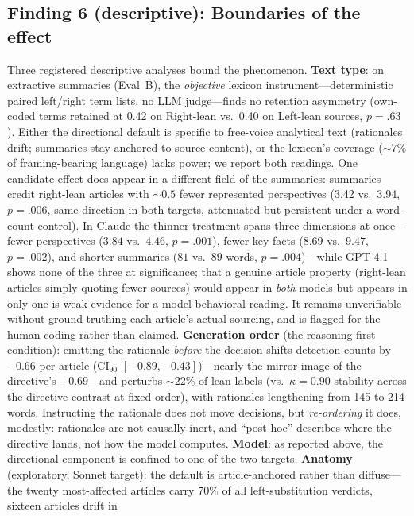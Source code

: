 \documentclass{article}
\newcommand{\kap}{\kappa}
\begin{document}
\subsection{Finding 6 (descriptive): Boundaries of the effect}
Three registered descriptive analyses bound the phenomenon.
\textbf{Text type}: on extractive summaries (Eval~B), the
\emph{objective} lexicon instrument---deterministic paired left/right
term lists, no LLM judge---finds no retention asymmetry (own-coded terms
retained at 0.42 on Right-lean vs.\ 0.40 on Left-lean sources, $p=.63$).
Either the directional default is specific to free-voice analytical text
(rationales drift; summaries stay anchored to source content), or the
lexicon's coverage (${\sim}7\%$ of framing-bearing language) lacks power;
we report both readings. One candidate effect does appear in a
different field of the summaries: summaries credit right-lean articles with ${\sim}0.5$
fewer represented perspectives (3.42 vs.\ 3.94, $p=.006$, same direction
in both targets, attenuated but persistent under a word-count control).
In Claude the thinner treatment spans three dimensions at once---fewer
perspectives ($3.84$ vs.\ $4.46$, $p=.001$), fewer key facts ($8.69$
vs.\ $9.47$, $p=.002$), and shorter summaries ($81$ vs.\ $89$ words,
$p=.004$)---while GPT-4.1 shows none of the three at significance; that
a genuine article property (right-lean articles simply quoting fewer
sources) would appear in \emph{both} models but appears in only one is
weak evidence for a model-behavioral reading. It remains
unverifiable without ground-truthing each article's actual sourcing,
and is flagged for the human coding rather than claimed. \textbf{Generation order} (the reasoning-first condition): emitting
the rationale \emph{before} the decision shifts detection counts by
$-0.66$ per article (CI$_{90}$ $[-0.89, -0.43]$)---nearly the mirror
image of the directive's $+0.69$---and perturbs ${\sim}22\%$ of lean labels
(vs.\ $\kap = 0.90$ stability across the directive contrast at fixed
order), with rationales lengthening from 145 to 214 words. Instructing
the rationale does not move decisions, but \emph{re-ordering} it
does, modestly: rationales are not causally inert, and
``post-hoc'' describes where the directive lands, not how the model
computes. \textbf{Model}: as reported above, the
directional component is confined to one of the two targets.
\textbf{Anatomy} (exploratory, Sonnet target): the default is
article-anchored rather than diffuse---the twenty most-affected articles
carry 70\% of all left-substitution verdicts, sixteen articles drift in
\end{document}
